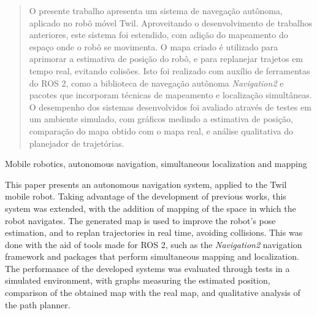 \documentclass[repeatfields,xlists,xpacks,oneside,yearsonly]{ufrgscca}
\begin{document}
\maketitle




\begin{abstract}

    O presente trabalho apresenta um sistema de navegação autônoma,
    aplicado no robô móvel Twil. Aproveitando o desenvolvimento de
    trabalhos anteriores, este sistema foi estendido, com adição do
    mapeamento do espaço onde o robô se movimenta. O mapa criado é
    utilizado para aprimorar a estimativa de posição do robô, e para
    replanejar trajetos em tempo real, evitando colisões. Isto foi
    realizado com auxílio de ferramentas do ROS 2, como a biblioteca de
    navegação autônoma \textit{Navigation2} e pacotes que incorporam
    técnicas de mapeamento e localização simultâneas. O desempenho dos
    sistemas desenvolvidos foi avaliado através de testes em um ambiente
    simulado, com gráficos medindo a estimativa de posição, comparação do
    mapa obtido com o mapa real, e análise qualitativa do planejador de
    trajetórias.

\end{abstract}

\begin{otherabstract}{Mobile robotics, autonomous navigation, simultaneous localization and mapping}

    This paper presents an autonomous navigation system, applied to the
    Twil mobile robot. Taking advantage of the development of previous
    works, this system was extended, with the addition of mapping of the
    space in which the robot navigates. The generated map is used to
    improve the robot's pose estimation, and to replan trajectories in
    real time, avoiding collisions. This was done with the aid of tools
    made for ROS 2, such as the \textit{Navigation2} navigation framework
    and packages that perform simultaneous mapping and localization. The
    performance of the developed systems was evaluated through tests in a
    simulated environment, with graphs measuring the estimated position,
    comparison of the obtained map with the real map, and qualitative
    analysis of the path planner.

\end{otherabstract}
\end{document}
